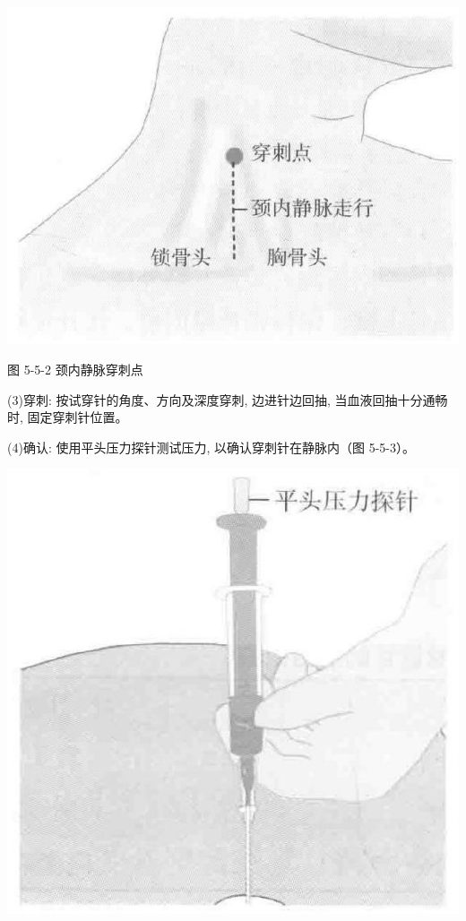 \documentclass[10pt]{article}
\begin{document}
\begin{center}
\includegraphics[max width=\textwidth]{2024_07_05_645bb794a4d4f32ee0c8g-303}
\end{center}

图 5-5-2 颈内静脉穿刺点

(3)穿刺: 按试穿针的角度、方向及深度穿刺, 边进针边回抽, 当血液回抽十分通畅时, 固定穿刺针位置。

(4)确认: 使用平头压力探针测试压力, 以确认穿刺针在静脉内（图 5-5-3）。

\begin{center}
\includegraphics[max width=\textwidth]{2024_07_05_645bb794a4d4f32ee0c8g-304}
\end{center}
\end{document}
